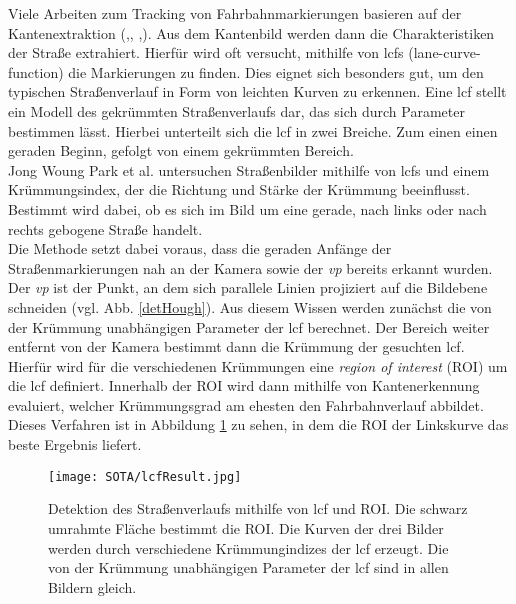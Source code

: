 Viele Arbeiten zum Tracking von Fahrbahnmarkierungen basieren auf der Kantenextraktion (\cite{Voisin2005},\cite{bai2010multiple}, \cite{Park20032301},\cite{wang2004lane}). Aus dem Kantenbild werden dann die Charakteristiken der Straße extrahiert.
Hierfür wird oft versucht, mithilfe von \glspl{lcf} (lane-curve-function) die Markierungen zu finden. Dies eignet sich besonders gut, um den typischen Straßenverlauf in Form von leichten Kurven zu erkennen. Eine \gls{lcf} stellt ein Modell des gekrümmten Straßenverlaufs dar, das sich durch Parameter bestimmen lässt. Hierbei unterteilt sich die \gls{lcf} in zwei Breiche. Zum einen einen geraden Beginn, gefolgt von einem gekrümmten Bereich.\\
Jong Woung Park et al.\cite{Park20032301} untersuchen Straßenbilder mithilfe von \glspl{lcf} und einem Krümmungsindex, der die Richtung und Stärke der Krümmung beeinflusst. Bestimmt wird dabei, ob es sich im Bild um eine gerade, nach links oder nach rechts gebogene Straße handelt.\\
Die Methode setzt dabei voraus, dass die geraden Anfänge der Straßenmarkierungen nah an der Kamera sowie der \textit{\gls{vp}}  bereits erkannt wurden. Der \textit{\gls{vp}} ist der Punkt, an dem sich parallele Linien projiziert auf die Bildebene schneiden (vgl. Abb. \ref{detHough}). Aus diesem Wissen werden zunächst die von der Krümmung unabhängigen Parameter der \gls{lcf} berechnet. Der Bereich weiter entfernt von der Kamera bestimmt dann die Krümmung der gesuchten \gls{lcf}. Hierfür wird für die verschiedenen Krümmungen eine \textit{region of interest} (ROI) um die \gls{lcf} definiert. Innerhalb der ROI wird dann mithilfe von Kantenerkennung evaluiert, welcher Krümmungsgrad am ehesten den Fahrbahnverlauf abbildet. Dieses Verfahren ist in Abbildung \ref{lcfDec} zu sehen, in dem die ROI der Linkskurve das beste Ergebnis liefert.
\begin{figure}[H]
	\centering
	\texttt{[image: SOTA/lcfResult.jpg]}
	\caption[Detektion eines Straßenverlaufs über eine \gls{lcf}]{Detektion des Straßenverlaufs mithilfe von \gls{lcf} und ROI. Die schwarz umrahmte Fläche bestimmt die ROI. Die Kurven der drei Bilder werden durch verschiedene Krümmungindizes der \gls{lcf} erzeugt. Die von der Krümmung unabhängigen Parameter der \gls{lcf} sind in allen Bildern gleich.}
	\label{lcfDec}
\end{figure}

